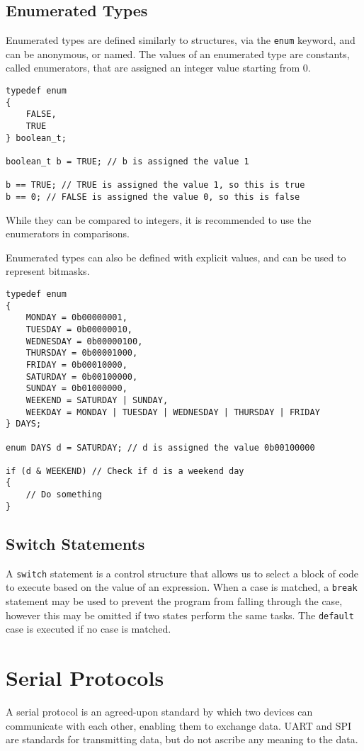 \documentclass{article}
\begin{document}
\subsection{Enumerated Types}
Enumerated types are defined similarly to structures, via the
\texttt{enum} keyword, and can be anonymous, or named. The
values of an enumerated type are constants, called enumerators, that
are assigned an integer value starting from 0.
\begin{verbatim}
typedef enum
{
    FALSE,
    TRUE
} boolean_t;

boolean_t b = TRUE; // b is assigned the value 1

b == TRUE; // TRUE is assigned the value 1, so this is true
b == 0; // FALSE is assigned the value 0, so this is false
\end{verbatim}
While they can be compared to integers, it is recommended to use the
enumerators in comparisons.

Enumerated types can also be defined with explicit values, and can be
used to represent bitmasks.
\begin{verbatim}
typedef enum
{
    MONDAY = 0b00000001,
    TUESDAY = 0b00000010,
    WEDNESDAY = 0b00000100,
    THURSDAY = 0b00001000,
    FRIDAY = 0b00010000,
    SATURDAY = 0b00100000,
    SUNDAY = 0b01000000,
    WEEKEND = SATURDAY | SUNDAY,
    WEEKDAY = MONDAY | TUESDAY | WEDNESDAY | THURSDAY | FRIDAY
} DAYS;

enum DAYS d = SATURDAY; // d is assigned the value 0b00100000

if (d & WEEKEND) // Check if d is a weekend day
{
    // Do something
}
\end{verbatim}
\subsection{Switch Statements}
A \texttt{switch} statement is a control structure that allows
us to select a block of code to execute based on the value of an
expression. When a case is matched, a \texttt{break} statement
may be used to prevent the program from falling through the case,
however this may be omitted if two states perform the same tasks. The
\texttt{default} case is executed if no case is matched.
\section{Serial Protocols}
A serial protocol is an agreed-upon standard by which two devices can
communicate with each other, enabling them to exchange data. UART and
SPI are standards for transmitting data, but do not ascribe any meaning
to the data.
\end{document}
